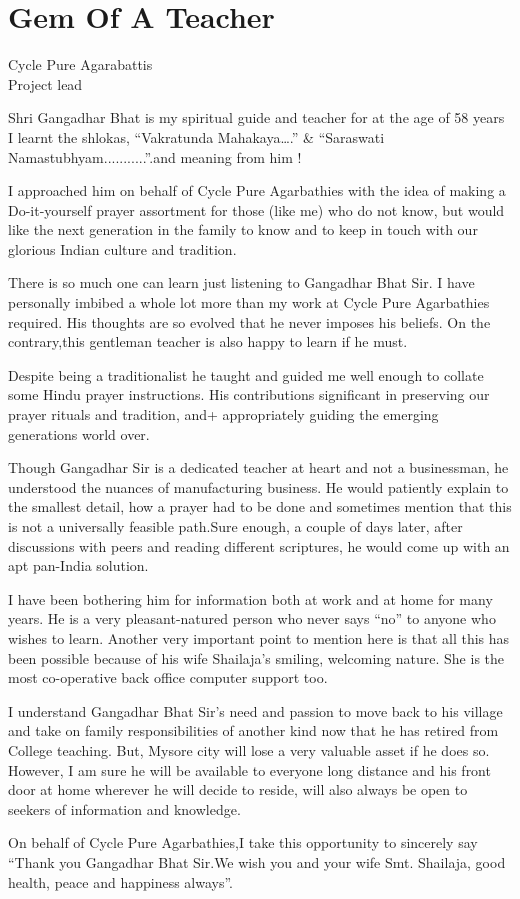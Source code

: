 \chapter{Gem Of A Teacher}

\begin{center}

\smallskip

Cycle Pure Agarabattis\\
Project lead
\addrule
\end{center}
Shri Gangadhar Bhat is my spiritual guide and teacher for at the age of 58 years I learnt the shlokas, “Vakratunda Mahakaya….” \& “Saraswati Namastubhyam...........”.and meaning from him !

I approached him on behalf of Cycle Pure Agarbathies with the idea of making a Do-it-yourself prayer assortment for those (like me) who do not know, but would like the next generation in the family to know and to keep in touch with our glorious Indian culture and tradition.

There is so much one can learn just listening to Gangadhar Bhat Sir. I have personally imbibed a whole lot more than my work at Cycle Pure Agarbathies required. His thoughts are so evolved that he never imposes his beliefs. On the contrary,this gentleman teacher is also happy to learn if he must.

Despite being a traditionalist he taught and guided me well enough to collate some Hindu prayer instructions. His contributions significant in preserving our prayer rituals and tradition, and+ appropriately guiding the emerging generations world over.

Though Gangadhar Sir is a dedicated teacher at heart and not a businessman, he understood the nuances of manufacturing business. He would patiently explain to the smallest detail, how a prayer had to be done and sometimes mention that this is not a universally feasible path.Sure enough, a couple of days later, after discussions with peers and reading different scriptures, he would come up with an apt pan-India solution.

I have been bothering him for information both at work and at home for many years. He is a very pleasant-natured person who never says “no” to anyone who wishes to learn. Another very important point to mention here is that all this has been possible because of his wife Shailaja’s smiling, welcoming nature. She is the most co-operative back office computer support too. 

I understand Gangadhar Bhat Sir’s need and passion to move back to his village and take on family responsibilities of another kind now that he has retired from College teaching. But, Mysore city will lose a very valuable asset if he does so. However, I am sure he will be available to everyone long distance and his front door at home wherever he will decide to reside, will also always be open to seekers of information and knowledge.

On behalf of Cycle Pure Agarbathies,I take this opportunity to sincerely say “Thank you Gangadhar Bhat Sir.We wish you and your wife Smt. Shailaja, good health, peace and happiness always”.

\articleend
